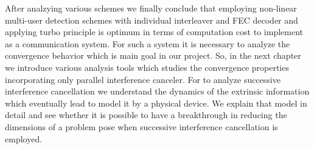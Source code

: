 After analzying various schemes we finally conclude that employing non-linear multi-user detection schemes with individual interleaver and FEC decoder and applying turbo principle is optimum in terms of computation cost to implement as a communication system. For such a system it is necessary to analyze the convergence behavior which is main goal in our project. So, in the next chapter we introduce various analysis tools which studies the convergence properties incorporating only parallel interference canceler. For to analyze successive interference cancellation we understand the dynamics of the extrinsic information which eventually lead to model it by a physical device. We explain that model in detail and see whether it is possible to have a breakthrough in reducing the dimensions of a problem pose when successive interference cancellation is employed.

